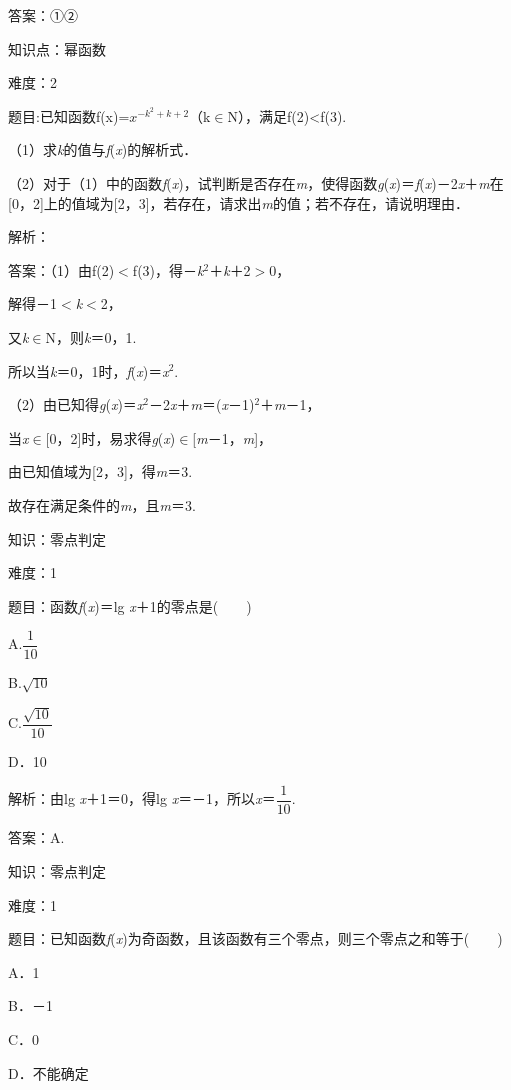 \documentclass{article} %
\begin{document}
答案：①②

知识点：幂函数

难度：2

题目:已知函数f(x)=$x^{-k^{2}+k+2}$（k$\in$N），满足f(2)<f(3).

（1）求\textit{k}的值与\textit{f}(\textit{x})的解析式．

（2）对于（1）中的函数\textit{f}(\textit{x})，试判断是否存在\textit{m}，使得函数\textit{g}(\textit{x})＝\textit{f}(\textit{x})－2\textit{x}＋\textit{m}在[0，2]上的值域为[2，3]，若存在，请求出\textit{m}的值；若不存在，请说明理由．

解析：

答案：（1）由f(2)$\mathrm{<}$f(3)，得－\textit{k}${}^{2}$＋\textit{k}＋2$\mathrm{>}$0，

解得－1$\mathrm{<}$\textit{k}$\mathrm{<}$2，

又\textit{k}$\mathrm{\in}$N，则\textit{k}＝0，1.

所以当\textit{k}＝0，1时，\textit{f}(\textit{x})＝\textit{x}${}^{2}$.

（2）由已知得\textit{g}(\textit{x})＝\textit{x}${}^{2}$－2\textit{x}＋\textit{m}＝(\textit{x}－1)${}^{2}$＋\textit{m}－1，

当\textit{x}$\mathrm{\in}$[0，2]时，易求得\textit{g}(\textit{x})$\mathrm{\in}$[\textit{m}－1，\textit{m}]，

由已知值域为[2，3]，得\textit{m}＝3.

故存在满足条件的\textit{m}，且\textit{m}＝3.

知识：零点判定

难度：1

题目：函数\textit{f}(\textit{x})＝lg \textit{x}＋1的零点是(　　)

A.$\dfrac{1}{10}$　　　

B.$\sqrt{10}$　

C.$\dfrac{\sqrt{10}}{10}$　　　

D．10

解析：由lg \textit{x}＋1＝0，得lg \textit{x}＝－1，所以\textit{x}＝$\dfrac{1}{10}$.

答案：A.

知识：零点判定

难度：1

题目：已知函数\textit{f}(\textit{x})为奇函数，且该函数有三个零点，则三个零点之和等于(　　)

A．1  

B．－1  

C．0  

D．不能确定
\end{document}
